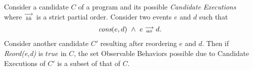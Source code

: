 \begin{theorem} 
    \label{ThmReord}
    Consider a candidate $C$ of a program and its possible \textit{Candidate Executions} where $\stackrel{\longrightarrow}{_\textit{hb}}$ is a strict partial order. Consider two events $e$ and $d$ such that 
    \begin{align*}
        \textit{cons}(e,d) \ \wedge \ e\stackrel{\longrightarrow}{_{ao}}d. 
    \end{align*}
    Consider another candidate $C'$ resulting after reordering $e$ and $d$. 
    Then if \emph{Reord(e,d)} is $true$ in $C$, the set Observable Behaviors possible due to Candidate Executions of $C'$ is a subset of that of $C$. 
\end{theorem}
